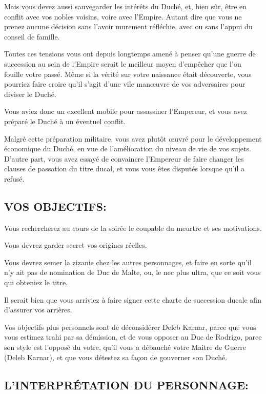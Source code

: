 \documentclass[14pt,twocolumn]{extarticle}
\begin{document}
Mais vous devez aussi sauvegarder les intérêts du Duché, et, bien sûr, être en
conflit avec vos nobles voisins, voire avec l'Empire. Autant dire que vous ne
prenez aucune décision sans l'avoir murement réfléchie, avec ou sans l'appui du
conseil de famille.

Toutes ces tensions vous ont depuis longtemps amené à penser qu'une guerre de
succession au sein de l'Empire serait le meilleur moyen d'empêcher que l'on
fouille votre passé. Même si la vérité sur votre naissance était découverte,
vous pourriez faire croire qu'il s'agit d'une vile manœuvre de vos
adversaires pour diviser le Duché.

Vous aviez donc un excellent mobile pour assassiner l'Empereur, et vous avez
préparé le Duché à un éventuel conflit.

Malgré cette préparation militaire, vous avez plutôt œuvré pour le
développement économique du Duché, en vue de l'amélioration du niveau de vie de
vos sujets. D'autre part, vous avez essayé de convaincre l'Empereur de faire
changer les clauses de passation du titre ducal, et vous vous êtes disputés
lorsque qu'il a refusé.

\subsection{VOS OBJECTIFS:}

Vous rechercherez au cours de la soirée le coupable du meurtre et ses
motivations.

Vous devrez garder secret vos origines réelles.

Vous devrez semer la zizanie chez les autres personnages, et faire en sorte
qu'il n'y ait pas de nomination de Duc de Malte, ou, le nec plus ultra, que ce
soit vous qui obteniez le titre.

Il serait bien que vous arriviez à faire signer cette charte de succession
ducale afin d'assurer vos arrières.

Vos objectifs plus personnels sont de déconsidérer Deleb Karnar, parce que vous
vous estimez trahi par sa démission, et de vous opposer au Duc de Rodrigo,
parce son style est l'opposé du votre, qu'il vous a débauché votre Maitre de
Guerre (Deleb Karnar), et que vous détestez sa façon de gouverner son Duché.

\subsection{L'INTERPRÉTATION DU PERSONNAGE:}
\end{document}
